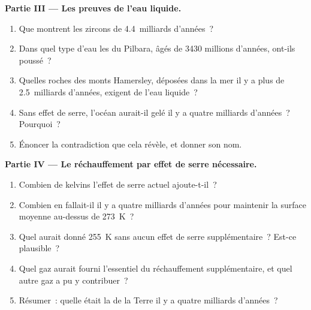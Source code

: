 \begin{problem}
\medskip
\noindent\textbf{Partie III --- Les preuves de l'eau liquide.}
\begin{enumerate}[resume]
  \item Que montrent les zircons de 4.4~milliards d'années~?
  \item Dans quel type d'eau les  du Pilbara, âgés de
        \num{3430} millions d'années, ont-ils poussé~?
  \item Quelles roches des monts Hamersley, déposées dans la mer il y a
        plus de 2.5~milliards d'années, exigent de l'eau liquide~?
  \item Sans effet de serre, l'océan aurait-il gelé il y a quatre milliards
        d'années~? Pourquoi~?
  \item Énoncer la contradiction que cela révèle, et donner son nom.
\end{enumerate}

\medskip
\noindent\textbf{Partie IV --- Le réchauffement par effet de serre nécessaire.}
\begin{enumerate}[resume]
  \item Combien de kelvins l'effet de serre actuel ajoute-t-il~?
  \item Combien en fallait-il il y a quatre milliards d'années pour
        maintenir la surface moyenne au-dessus de \qty{273}{K}~?
  \item Quel  aurait donné \qty{255}{K} sans aucun effet de serre
        supplémentaire~? Est-ce plausible~?
  \item Quel gaz aurait fourni l'essentiel du réchauffement
        supplémentaire, et quel autre gaz a pu y contribuer~?
  \item Résumer~: quelle était la  de la Terre il y
        a quatre milliards d'années~?
\end{enumerate}
\end{problem}

